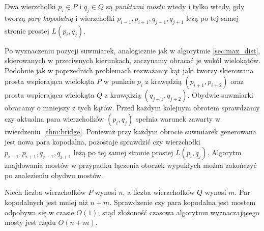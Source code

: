 \begin{twierdzenie}[Toussaint 1983]
\label{thm:bridge}
  Dwa wierzchołki $p_i \in P$ i $q_j \in Q$ są \emph{punktami mostu}
  wtedy i tylko wtedy, gdy tworzą \emph{parę kopodalną} i wierzchołki
  $p_{i-1}, p_{i+1}, q_{j-1}, q_{j+1}$ leżą po tej samej stronie
  prostej $L(p_i, q_j)$.
\end{twierdzenie}

Po wyznaczeniu pozycji suwmiarek, analogicznie jak w algorytmie
\ref{sec:max_dist}, skierowanych w przeciwnych kierunkach, zaczynamy
obracać je wokół wielokątów. Podobnie jak w poprzednich problemach
rozważamy kąt jaki tworzy skierowana prosta wspierająca wielokąta $P$
w punkcie $p_i$ z krawędzią $(p_{i+1}, p_{i+2})$ oraz prosta
wspierająca wielokąta $Q$ z krawędzią $(q_{j+1}, q_{j+2})$. Obydwie
suwmiarki obracamy o mniejszy z tych kątów. Przed każdym kolejnym
obrotem sprawdzamy czy aktualna para wierzchołków $(p_i, q_j)$ spełnia
warunek zawarty w twierdzeniu~\ref{thm:bridge}. Ponieważ przy każdym
obrocie suwmiarek generowana jest nowa para kopodalna, pozostaje
sprawdzić czy wierzchołki $p_{i-1}, p_{i+1}, q_{j-1}, q_{j+1}$ leżą po
tej samej stronie prostej $L(p_i, q_j)$. Algorytm znajdowania mostów w
przypadku łączenia otoczek wypukłych można zakończyć po znalezieniu
obydwu mostów.

Niech liczba wierzchołków $P$ wynosi $n$, a liczba wierzchołków $Q$
wynosi $m$. Par kopodalnych jest mniej niż $n + m$. Sprawdzenie czy
para kopodalna jest mostem odpobywa się w czasie $O(1)$, stąd
złożoność czasowa algorytmu wyznaczającego mosty jest rzędu $O(n +
m)$.

